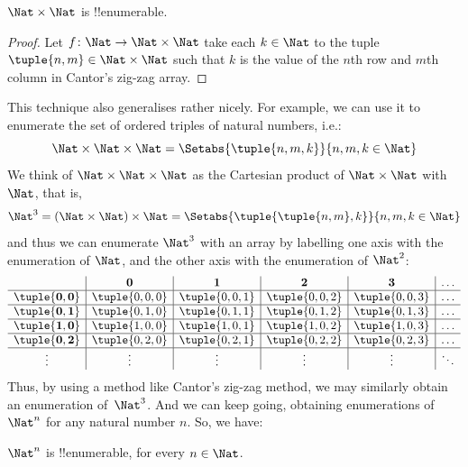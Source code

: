 \begin{prop}
$\Nat \times \Nat$ is !!{enumerable}.
\end{prop}

\begin{proof}
Let $f \colon \Nat \to \Nat\times\Nat$ take each $k \in \Nat$ to the
tuple $\tuple{n,m} \in \Nat \times \Nat$ such that $k$ is the value of
the $n$th row and $m$th column in Cantor's zig-zag array. 
\end{proof}

\begin{explain}
This technique also generalises rather nicely. For example, we can use
it to enumerate the set of ordered triples of natural numbers, i.e.:
\[
\Nat \times \Nat \times \Nat = \Setabs{\tuple{n,m,k}}{n,m,k \in \Nat}
\]
We think of $\Nat \times \Nat \times \Nat$ as the Cartesian
product of $\Nat \times \Nat$ with $\Nat$, that is,
\[
\Nat^3 = (\Nat \times \Nat) \times \Nat =
\Setabs{\tuple{\tuple{n,m},k}}{n, m, k
  \in \Nat }
\]
and thus we can enumerate $\Nat^3$ with an array by labelling one
axis with the enumeration of $\Nat$, and the other axis with the
enumeration of $\Nat^2$:
\[
\begin{array}{ c | c | c | c | c | c}
& \mathbf 0 & \mathbf 1 & \mathbf 2 & \mathbf 3 & \dots \\
\hline
\mathbf{\tuple{0,0}} & \tuple{0,0,0} & \tuple{0,0,1} & \tuple{0,0,2} & \tuple{0,0,3} & \dots \\
\hline
\mathbf{\tuple{0,1}} & \tuple{0,1,0} & \tuple{0,1,1} & \tuple{0,1,2} & \tuple{0,1,3} & \dots \\
\hline
\mathbf{\tuple{1,0}} & \tuple{1,0,0} & \tuple{1,0,1} & \tuple{1,0,2} & \tuple{1,0,3} & \dots \\
\hline
\mathbf{\tuple{0,2}} & \tuple{0,2,0} & \tuple{0,2,1} & \tuple{0,2,2} & \tuple{0,2,3} & \dots\\
\hline
\vdots & \vdots & \vdots & \vdots & \vdots & \ddots \\
\end{array}
\]
Thus, by using a method like Cantor's zig-zag method, we may similarly
obtain an enumeration of~$\Nat^3$. And we can keep going, obtaining
enumerations of $\Nat^n$ for any natural number $n$. So, we have:
\end{explain}

\begin{prop}
$\Nat^n$ is !!{enumerable}, for every $n \in \Nat$.
\end{prop}

